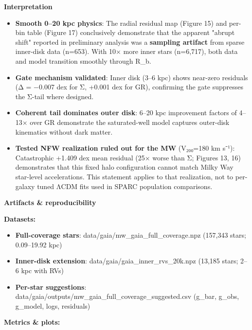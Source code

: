 \documentclass[11pt,a4paper]{article}
\begin{document}
\textbf{Interpretation}

\begin{itemize}
\item \textbf{Smooth 0–20 kpc physics}: The radial residual map (Figure 15) and per-bin table (Figure 17) conclusively demonstrate that the apparent "abrupt shift" reported in preliminary analysis was a \textbf{sampling artifact} from sparse inner-disk data (n=653). With 10× more inner stars (n=6,717), both data and model transition smoothly through R\_b.
\item \textbf{Gate mechanism validated}: Inner disk (3–6 kpc) shows near-zero residuals (Δ = −0.007 dex for Σ, +0.001 dex for GR), confirming the gate suppresses the Σ-tail where designed.
\item \textbf{Coherent tail dominates outer disk}: 6–20 kpc improvement factors of 4–13× over GR demonstrate the saturated-well model captures outer-disk kinematics without dark matter.
\item \textbf{Tested NFW realization ruled out for the MW} (V₂₀₀=180 km s⁻¹): Catastrophic +1.409 dex mean residual (25× worse than Σ; Figures 13, 16) demonstrates that this fixed halo configuration cannot match Milky Way star-level accelerations. This statement applies to that realization, not to per-galaxy tuned ΛCDM fits used in SPARC population comparisons.
\end{itemize}


\textbf{Artifacts \& reproducibility}


\textbf{Datasets:}

\begin{itemize}
\item \textbf{Full-coverage stars}: data/gaia/mw\_gaia\_full\_coverage.npz (157,343 stars; 0.09–19.92 kpc)
\item \textbf{Inner-disk extension}: data/gaia/gaia\_inner\_rvs\_20k.npz (13,185 stars; 2–6 kpc with RVs)
\item \textbf{Per-star suggestions}: data/gaia/outputs/mw\_gaia\_full\_coverage\_suggested.csv (g\_bar, g\_obs, g\_model, logs, residuals)
\end{itemize}


\textbf{Metrics \& plots:}
\end{document}
